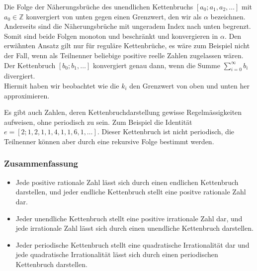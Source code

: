 Die Folge der Näherungsbrüche des unendlichen Kettenbruchs
$[a_0;a_1,a_2,\dots]$ mit $a_0 \in \mathbb{Z}$ konvergiert 
von unten gegen einen Grenzwert, den wir als $\alpha$
bezeichnen. Anderseits sind die Näherungsbrüche mit ungeradem
Index nach unten begrenzt. Somit sind beide Folgen monoton und beschränkt 
und konvergieren in $\alpha$. Den erwähnten Ansatz gilt nur für reguläre Kettenbrüche, es 
wäre zum Beispiel nicht der Fall, wenn als Teilnenner beliebige positive reelle Zahlen 
zugelassen wären. Der Kettenbruch $[b_0;b_1,\dots]$ konvergiert genau dann, wenn die Summe
$\sum\limits_{i=0}^\infty b_i $ divergiert.\\
Hiermit haben wir beobachtet wie die $k_i$ den Grenzwert von oben und unten her approximieren.

Es gibt auch Zahlen, deren Kettenbruchdarstellung gewisse
Regelmässigkeiten aufweisen, ohne periodisch zu sein. Zum Beispiel
die Identität $e = [2;1,2,1,1,4,1,1,6,1,\dots]$. Dieser
Kettenbruch ist nicht periodisch, die Teilnenner können aber durch
eine rekursive Folge bestimmt werden.

\subsubsection{Zusammenfassung}
\begin{itemize}
\item
Jede positive rationale Zahl lässt sich durch einen endlichen
Kettenbruch darstellen, und jeder endliche Kettenbruch stellt eine
positve rationale Zahl dar.
\item
Jeder unendliche Kettenbruch stellt eine positive irrationale Zahl
dar, und jede irrationale Zahl lässt sich durch einen unendliche
Kettenbruch darstellen.
\item
Jeder periodische Kettenbruch stellt eine quadratische Irrationalität
dar und jede quadratische Irrationalität lässt sich durch einen
periodischen Kettenbruch darstellen.
\end{itemize}
